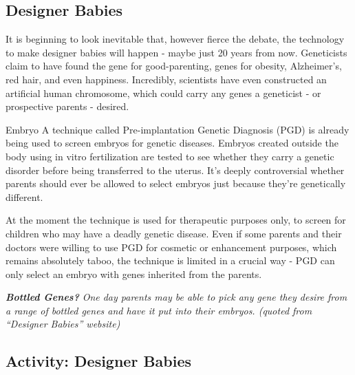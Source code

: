 \documentclass[
]{book}
\begin{document}
\hypertarget{designer-babies}{%
\subsection*{Designer Babies}\label{designer-babies}}

It is beginning to look inevitable that, however fierce the debate, the technology to make designer babies will happen - maybe just 20 years from now. Geneticists claim to have found the gene for good-parenting, genes for obesity, Alzheimer's, red hair, and even happiness. Incredibly, scientists have even constructed an artificial human chromosome, which could carry any genes a geneticist - or prospective parents - desired.

Embryo A technique called Pre-implantation Genetic Diagnosis (PGD) is already being used to screen embryos for genetic diseases. Embryos created outside the body using in vitro fertilization are tested to see whether they carry a genetic disorder before being transferred to the uterus. It's deeply controversial whether parents should ever be allowed to select embryos just because they're genetically different.

At the moment the technique is used for therapeutic purposes only, to screen for children who may have a deadly genetic disease. Even if some parents and their doctors were willing to use PGD for cosmetic or enhancement purposes, which remains absolutely taboo, the technique is limited in a crucial way - PGD can only select an embryo with genes inherited from the parents.

\textbf{\emph{Bottled Genes?}} \emph{One day parents may be able to pick any gene they desire from a range of bottled genes and have it put into their embryos. (quoted from ``Designer Babies'' website)}

\hypertarget{activity-designer-babies}{%
\subsection*{Activity: Designer Babies}\label{activity-designer-babies}}
\end{document}
